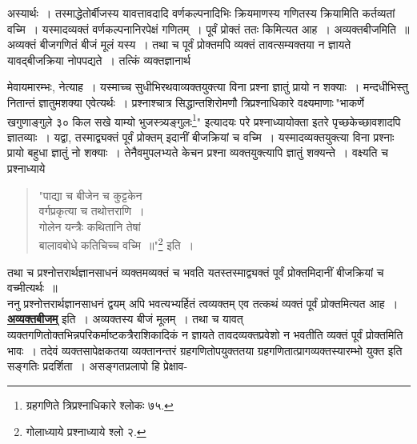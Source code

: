 \documentclass[11pt, openany]{book}
\begin{document}
 अस्यार्थः~। तस्माद्धेतोर्बीजस्य यावत्तावदादि वर्णकल्पनादिभिः क्रियमाणस्य गणितस्य क्रियामिति कर्तव्यतां वच्मि~। यस्मादव्यक्तं
वर्णकल्पनानिरपेक्षं गणितम्~। पूर्वं प्रोक्तं ततः किमित्यत आह~। अव्यक्तबीजमिति~॥ 
अव्यक्तं बीजगणितं बीजं मूलं यस्य~। तथा च पूर्वं प्रोक्तमपि व्यक्तं 
तावत्सम्यक्तया न ज्ञायते यावद्बीजक्रिया नोपपद्यते~। तत्किं
व्यक्तज्ञानार्थ\textendash
\newpage

\noindent मेवायमारम्भः, नेत्याह~। यस्माच्च सुधीभिरथवाव्यक्तयुक्त्या विना प्रश्ना
ज्ञातुं प्रायो न शक्याः~। मन्दधीभिस्तु नितान्तं ज्ञातुमशक्या एवेत्यर्थः~।
प्रश्नाश्चात्र {\qt सिद्धान्तशिरोमणौ त्रिप्रश्नाधिकारे} वक्ष्यमाणाः\textendash \,{\qt "भाकर्णे खगुणाङ्गुले ३० किल सखे याम्यो भुजस्त्र्यङ्गुलः\renewcommand{\thefootnote}{*}\footnote{ग्रहगणिते त्रिप्रश्नाधिकारे श्लोकः ७५.}"}  इत्यादयः परे प्रश्नाध्यायोक्ता इतरे
पृच्छकेच्छावशादपि ज्ञातव्याः~। यद्वा, तस्माद्व्यक्तं पूर्वं प्रोक्तम् इदानीं
बीजक्रियां च वच्मि~। यस्मादव्यक्तयुक्त्या विना प्रश्नाः प्रायो बहुधा ज्ञातुं नो 
शक्याः~। तेनैवमुपलभ्यते केचन प्रश्ना व्यक्तयुक्त्यापि ज्ञातुं शक्यन्ते~।
वक्ष्यति च {\qt प्रश्नाध्याये\textendash }
\begin{quote}
    {\qt 
     "पाद्या च बीजेन च कुट्टकेन \\

\vspace{-7mm}
\hspace{1cm} वर्गप्रकृत्या च तथोत्तराणि~। \\

\vspace{-7mm}
\hspace{1mm} गोलेन यन्त्रैः कथितानि तेषां \\

\vspace{-7mm}
\hspace{1cm} बालावबोधे कतिचिच्च वच्मि~॥"}\renewcommand{\thefootnote}{$\dag$}\footnote{गोलाध्याये प्रश्नाध्याये श्लो २.} इति~। 

\end{quote}

 तथा च प्रश्नोत्तरार्थज्ञानसाधनं व्यक्तमव्यक्तं च भवति यतस्तस्माद्व्यक्तं पूर्वं प्रोक्तमिदानीं बीजक्रियां च वच्मीत्यर्थः~॥ \\

\vspace{-3mm}
 ननु प्रश्नोत्तरार्थज्ञानसाधनं द्वयम् अपि भवत्यभ्यर्हितं त्वव्यक्तम् एव
तत्कथं व्यक्तं पूर्वं प्रोक्तमित्यत आह~। \hyperref[1.2]{\textbf{अव्यक्तबीजम्}} इति~। अव्यक्तस्य बीजं मूलम्~। तथा च यावत् व्यक्तगणितोक्तभिन्नपरिकर्माष्टकत्रैराशिकादिकं न 
ज्ञायते तावदव्यक्तप्रवेशो न भवतीति व्यक्तं पूर्वं प्रोक्तमिति भावः~। 
तदेवं व्यक्तसापेक्षकतया व्यक्तानन्तरं ग्रहगणितोपयुक्ततया
ग्रहगणितात्प्रागव्यक्तस्यारम्भो युक्त इति सङ्गतिः प्रदर्शिता~। असङ्गतप्रलापो हि
प्रेक्षाव-
\newpage
\end{document}
